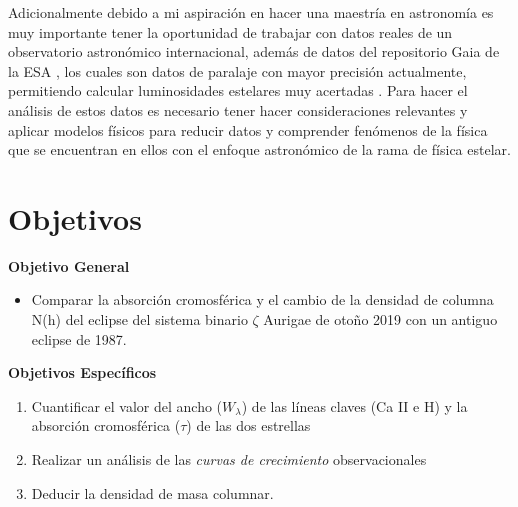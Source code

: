\documentclass[11pt]{article}
\begin{document}

\noindent Adicionalmente debido a mi aspiración en hacer una maestría en astronomía es muy importante tener la oportunidad de trabajar con datos reales de un observatorio astronómico internacional, además de datos del repositorio Gaia de la ESA \cite{carrasco2006diseno}, los cuales son datos de paralaje con mayor precisión actualmente, permitiendo calcular luminosidades estelares muy acertadas \cite{fustes2014extraccion}. Para hacer el análisis de estos datos es necesario tener hacer consideraciones relevantes y aplicar modelos físicos para reducir datos y comprender fenómenos de la física que se encuentran en ellos con el enfoque astronómico de la rama de física estelar.

\section{Objetivos}

\textbf{Objetivo General}

\begin{itemize}
\item Comparar la absorción cromosférica y el cambio de la densidad de columna N(h) del eclipse del sistema binario $\zeta$ Aurigae de otoño 2019 con un antiguo eclipse de 1987.
\end{itemize}
\textbf{Objetivos Espec\'ificos}
\begin{enumerate}
    \item Cuantificar el valor del ancho ($W_{\lambda}$) de las líneas claves (Ca II e H)  y la  absorción cromosférica ($\tau$) de las dos estrellas

    \item Realizar un análisis de las \textit{curvas de crecimiento} observacionales

    \item Deducir la densidad de masa columnar.
\end{enumerate}
\end{document}
